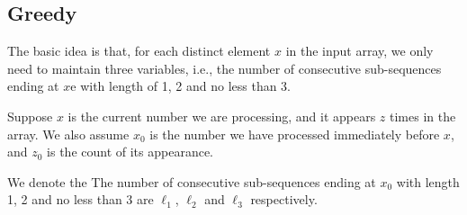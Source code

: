 \subsection{Greedy}
The basic idea is that, for each distinct element $x$ in the input array, we only need to maintain three variables, i.e., the number of consecutive sub-sequences ending at $x$e with length of 1, 2 and no less than 3.

Suppose $x$ is the current number we are processing, and it appears $z$ times in the array. We also assume $x_0$ is the number we have processed immediately before $x$, and $z_0$ is the count of its appearance. 

We denote the The number of consecutive sub-sequences ending at $x_0$ with length 1, 2 and no less than 3 are $\ell_1$, $\ell_2$ and $\ell_3$ respectively.

